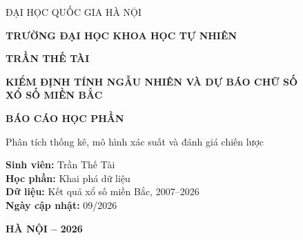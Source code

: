 \documentclass[a4paper,12pt,oneside]{book}
\numberwithin{equation}{chapter}
\begin{document}
\begin{titlepage}
\thispagestyle{empty}
\thisfancypage{\setlength{\fboxrule}{2pt}\doublebox}{}
\centering
\fontsize{15pt}{18pt}\selectfont
{ĐẠI HỌC QUỐC GIA HÀ NỘI\par}
\vspace{0.15cm}
{\bfseries TRƯỜNG ĐẠI HỌC KHOA HỌC TỰ NHIÊN\par}

\vspace*{2.4cm}
{\Large\bfseries TRẦN THẾ TÀI\par}

\vspace*{2.7cm}
{\Large\bfseries KIỂM ĐỊNH TÍNH NGẪU NHIÊN VÀ DỰ BÁO CHỮ SỐ\\[0.25cm]
XỔ SỐ MIỀN BẮC\par}

\vspace*{2.1cm}
{\large\bfseries BÁO CÁO HỌC PHẦN\par}
\vspace{0.35cm}
{\large Phân tích thống kê, mô hình xác suất và đánh giá chiến lược\par}

\vfill
\begin{minipage}{0.78\textwidth}
\fontsize{13pt}{19pt}\selectfont
\textbf{Sinh viên:} Trần Thế Tài\\
\textbf{Học phần:} Khai phá dữ liệu\\
\textbf{Dữ liệu:} Kết quả xổ số miền Bắc, 2007--2026\\
\textbf{Ngày cập nhật:} 09/2026
\end{minipage}

\vfill
{\bfseries HÀ NỘI -- 2026\par}
\vspace*{0.3cm}
\end{titlepage}

\frontmatter
\fontsize{13pt}{20pt}\selectfont



\setcounter{tocdepth}{2}
\tableofcontents

\listoffigures
\listoftables

\mainmatter
\fontsize{13pt}{18pt}\selectfont








\backmatter
\fontsize{13pt}{18pt}\selectfont

\end{document}
